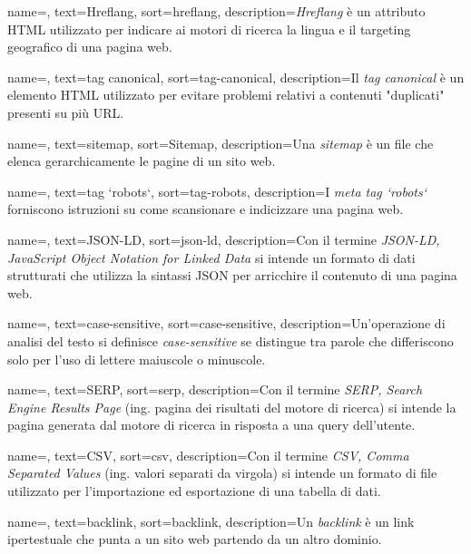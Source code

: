  {
    name=,
    text=Hreflang,
    sort=hreflang,
    description={\emph{Hreflang} è un attributo HTML utilizzato per indicare ai motori di ricerca la lingua e il targeting geografico di una pagina web.}
}

 {
    name=,
    text=tag canonical,
    sort=tag-canonical,
    description={Il \emph{tag canonical} è un elemento HTML utilizzato per evitare problemi relativi a contenuti "duplicati" presenti su più URL.}
}

 {
    name=,
    text=sitemap,
    sort=Sitemap,
    description={Una \emph{sitemap} è un file che elenca gerarchicamente le pagine di un sito web.}
}

 {
    name=,
    text=tag `robots`,
    sort=tag-robots,
    description={I \emph{meta tag `robots`} forniscono istruzioni su come scansionare e indicizzare una pagina web.}
}

 {
    name=,
    text=JSON-LD,
    sort=json-ld,
    description={Con il termine \emph{JSON-LD, JavaScript Object Notation for Linked Data} si intende un formato di dati strutturati che utilizza la sintassi JSON per arricchire il contenuto di una pagina web.}
}

 {
    name=,
    text=case-sensitive,
    sort=case-sensitive,
    description={Un'operazione di analisi del testo si definisce \emph{case-sensitive} se distingue tra parole che differiscono solo per l'uso di lettere maiuscole o minuscole.}
}

 {
    name=,
    text=SERP,
    sort=serp,
    description={Con il termine \emph{SERP, Search Engine Results Page} (ing. pagina dei risultati del motore di ricerca) si intende la pagina generata dal motore di ricerca in risposta a una query dell'utente.}
}

 {
    name=,
    text=CSV,
    sort=csv,
    description={Con il termine \emph{CSV, Comma Separated Values} (ing. valori separati da virgola) si intende un formato di file utilizzato per l'importazione ed esportazione di una tabella di dati.}
}

 {
    name=,
    text=backlink,
    sort=backlink,
    description={Un \emph{backlink} è un link ipertestuale che punta a un sito web partendo da un altro dominio.}
}

